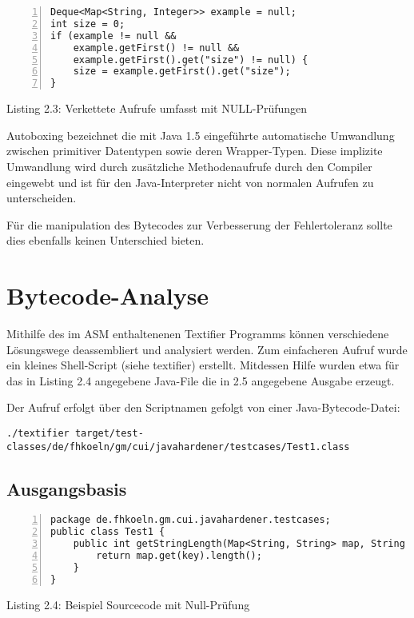 \vspace{0.3cm}

\begin{lstlisting}[basicstyle=\ttfamily,numbers=left,numberstyle=\footnotesize\ttfamily,backgroundcolor=\color{source}]
Deque<Map<String, Integer>> example = null;
int size = 0;
if (example != null &&
	example.getFirst() != null &&
	example.getFirst().get("size") != null) {
	size = example.getFirst().get("size");
}
\end{lstlisting}
\centerline{Listing 2.3: Verkettete Aufrufe umfasst mit NULL-Prüfungen}

\vspace{0.3cm}

Autoboxing bezeichnet die mit Java 1.5 eingeführte automatische Umwandlung zwischen
primitiver Datentypen sowie deren Wrapper-Typen. Diese implizite Umwandlung wird
durch zusätzliche Methodenaufrufe durch den Compiler eingewebt und ist für den
Java-Interpreter nicht von normalen Aufrufen zu unterscheiden.

Für die manipulation des Bytecodes zur Verbesserung der Fehlertoleranz sollte
dies ebenfalls keinen Unterschied bieten.


\section{Bytecode-Analyse}

Mithilfe des im ASM enthaltenenen Textifier Programms können verschiedene Lösungswege
deassembliert und analysiert werden. Zum einfacheren Aufruf wurde ein kleines Shell-Script
(siehe textifier) erstellt. Mitdessen Hilfe wurden etwa für das in Listing 2.4 angegebene
Java-File die in 2.5 angegebene Ausgabe erzeugt.

Der Aufruf erfolgt über den Scriptnamen gefolgt von einer Java-Bytecode-Datei:

\texttt{./textifier target/test-classes/de/fhkoeln/gm/cui/javahardener/testcases/Test1.class}


\subsection{Ausgangsbasis}

\begin{lstlisting}[basicstyle=\ttfamily,numbers=left,numberstyle=\footnotesize\ttfamily,backgroundcolor=\color{source}]
package de.fhkoeln.gm.cui.javahardener.testcases;
public class Test1 {
	public int getStringLength(Map<String, String> map, String key) {
		return map.get(key).length();
	}
}
\end{lstlisting}
\centerline{Listing 2.4: Beispiel Sourcecode mit Null-Prüfung}

